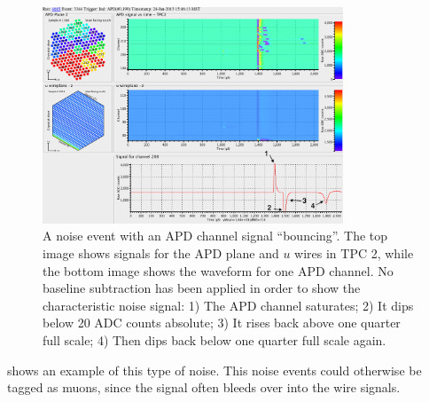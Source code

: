 \documentclass[herrin-thesis.tex]{subfiles}
\begin{document}
\begin{figure}
\centering
\includegraphics[width=0.8\textwidth]{./plots/noise_eventdisplay_run_4685_ev_3344_annotated.png}
\caption[APD ``bouncing'' noise]{A noise event with an APD channel signal ``bouncing''. The top image shows signals for the APD plane and \(u\) wires in TPC 2, while the bottom image shows the waveform for one APD channel. No baseline subtraction has been applied in order to show the characteristic noise signal: 1) The APD channel saturates; 2) It dips below 20 ADC counts absolute; 3) It rises back above one quarter full scale; 4) Then dips back below one quarter full scale again.}
\label{fig:noise_apd_bounce}
\end{figure}

 shows an example of this type of noise. This noise events could otherwise be tagged as muons, since the signal often bleeds over into the wire signals.
\end{document}

